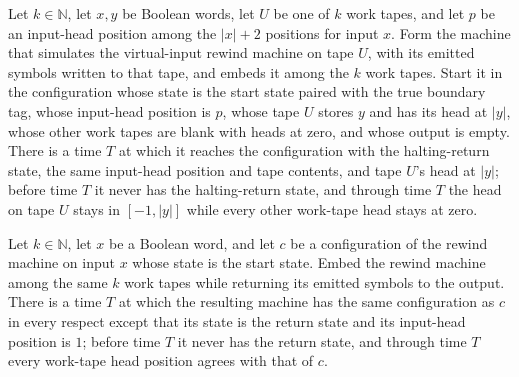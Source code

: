 \begin{theorem}
\label{Complexity.b2b_origin_run}
\leanok
{}
Let $k\in\mathbb{N}$, let $x,y$ be Boolean words, let $U$ be one of $k$ work tapes, and
let $p$ be an input-head position among the $|x|+2$ positions for input $x$. Form the
machine that simulates the virtual-input rewind machine on tape $U$, with its emitted
symbols written to that tape, and embeds it among the $k$ work tapes. Start it in the
configuration whose state is the start state paired with the true boundary tag, whose
input-head position is $p$, whose tape $U$ stores $y$ and has its head at $|y|$, whose
other work tapes are blank with heads at zero, and whose output is empty. There is a
time $T$ at which it reaches the configuration with the halting-return state, the same
input-head position and tape contents, and tape $U$'s head at $|y|$; before time $T$ it
never has the halting-return state, and through time $T$ the head on tape $U$ stays in
$[-1,|y|]$ while every other work-tape head stays at zero.
\end{theorem}

\begin{theorem}
\label{Complexity.b2b_rewind_return}
\leanok
{}
Let $k\in\mathbb{N}$, let $x$ be a Boolean word, and let $c$ be a configuration of the
rewind machine on input $x$ whose state is the start state. Embed the rewind machine
among the same $k$ work tapes while returning its emitted symbols to the output. There
is a time $T$ at which the resulting machine has the same configuration as $c$ in every
respect except that its state is the return state and its input-head position is $1$;
before time $T$ it never has the return state, and through time $T$ every work-tape head
position agrees with that of $c$.
\end{theorem}


